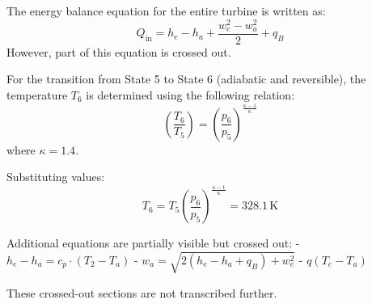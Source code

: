 The energy balance equation for the entire turbine is written as:  
\[
Q_{\text{in}} = h_e - h_a + \frac{w_e^2 - w_a^2}{2} + q_B
\]  
However, part of this equation is crossed out.

For the transition from State 5 to State 6 (adiabatic and reversible), the temperature \( T_6 \) is determined using the following relation:  
\[
\left( \frac{T_6}{T_5} \right) = \left( \frac{p_6}{p_5} \right)^{\frac{\kappa - 1}{\kappa}}
\]  
where \( \kappa = 1.4 \).  

Substituting values:  
\[
T_6 = T_5 \left( \frac{p_6}{p_5} \right)^{\frac{\kappa - 1}{\kappa}} = 328.1 \, \text{K}
\]  

Additional equations are partially visible but crossed out:  
- \( h_e - h_a = c_p \cdot (T_2 - T_a) \)  
- \( w_a = \sqrt{2 \left( h_e - h_a + q_B \right) + w_e^2} \)  
- \( q(T_e - T_a) \)  

These crossed-out sections are not transcribed further.